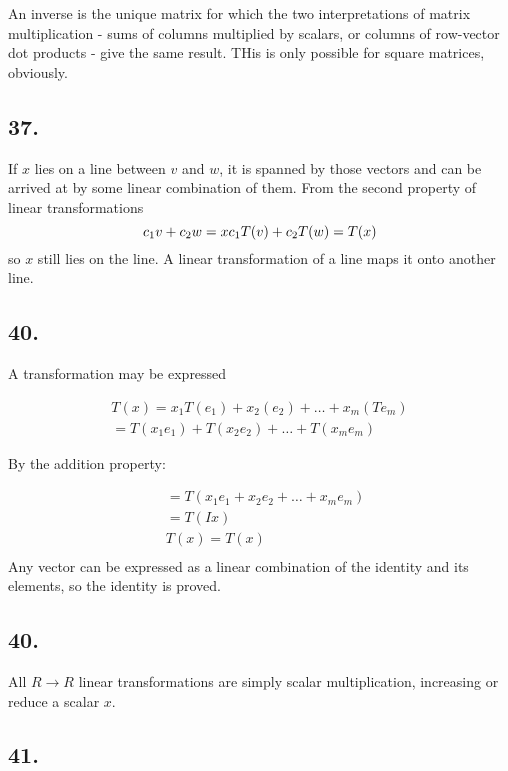 \documentclass[]{article}
\begin{document}
An inverse is the unique matrix for which the two interpretations of
matrix multiplication - sums of columns multiplied by scalars, or
columns of row-vector dot products - give the same result. THis is only
possible for square matrices, obviously.

\hypertarget{section-2}{%
\subsection{37.}\label{section-2}}

If \(x\) lies on a line between \(v\) and \(w\), it is spanned by those
vectors and can be arrived at by some linear combination of them. From
the second property of linear transformations \[
c_1v+c_2w=x\\
c_1T(v) + c_2T(w) = T(x)
\] so \(x\) still lies on the line. A linear transformation of a line
maps it onto another line.

\hypertarget{section-3}{%
\subsection{40.}\label{section-3}}

A transformation may be expressed

\[
\begin{aligned}
T(x) = x_1T(e_1)+x_2(e_2)+\dots+x_m(Te_m)\\
=T(x_1e_1)+T(x_2e_2)+\dots+T(x_me_m)
\end{aligned}
\]

By the addition property:

\[
\begin{aligned}
& = T(x_1e_1+x_2e_2+\dots+x_me_m)\\
&=T(Ix)\\
&T(x)=T(x)\\
\end{aligned}
\] Any vector can be expressed as a linear combination of the identity
and its elements, so the identity is proved.

\hypertarget{section-4}{%
\subsection{40.}\label{section-4}}

All \(R\rightarrow{R}\) linear transformations are simply scalar
multiplication, increasing or reduce a scalar \(x\).

\hypertarget{section-5}{%
\subsection{41.}\label{section-5}}
\end{document}
